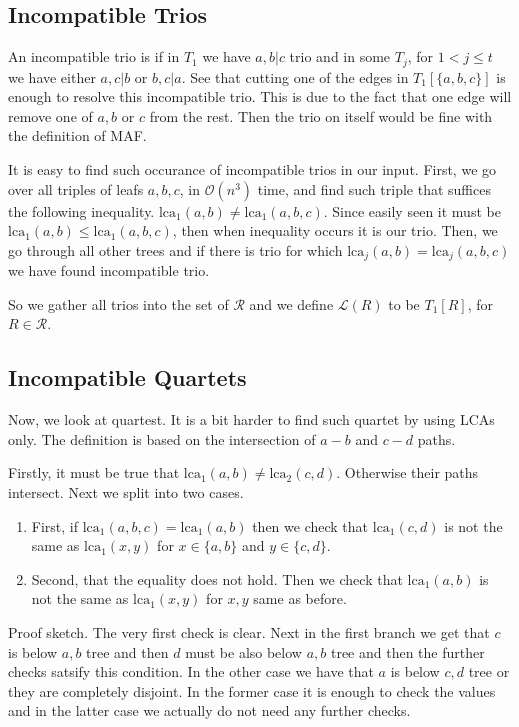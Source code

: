 \documentclass{article}
\theoremstyle{plain}
\theoremstyle{definition}
\newcommand{\lca}{\mathrm{lca}}
\newcommand{\bigO}{\mathcal{O}}
\newcommand{\trios}{\mathcal{R}}
\begin{document}
  \subsection{Incompatible Trios}

  An incompatible trio is if in $T_1$ we have $a,b|c$ trio and in some $T_j$, for $1 < j \leq t$
  we have either $a,c|b$ or $b,c|a$. See that cutting one of the edges in $T_1[\{a,b,c\}]$ is enough
  to resolve this incompatible trio. This is due to the fact that one edge will
  remove one of $a,b$ or $c$ from the rest. Then the trio on itself would be fine
  with the definition of MAF. 

  It is easy to find such occurance of incompatible trios in our input. First, we go
  over all triples of leafs $a,b,c$, in $\bigO(n^3)$ time, and find such triple that
  suffices the following inequality. $\lca_1(a,b) \neq \lca_1(a,b,c)$. Since
  easily seen it must be $\lca_1(a,b) \leq \lca_1(a,b,c)$, then when inequality
  occurs it is our trio. Then, we go through all other trees and if
  there is trio for which $\lca_j(a,b) = \lca_j(a,b,c)$ we have found incompatible
  trio.

  So we gather all trios into the set of $\trios$ and we define $\mathcal{L}(R)$
  to be $T_1[R]$, for $R \in \trios$.

  \subsection{Incompatible Quartets}

  Now, we look at quartest. It is a bit harder to find such quartet by using LCAs only. The
  definition is based on the intersection of $a-b$ and $c-d$ paths.

  Firstly, it must be true that $\lca_1(a,b) \neq \lca_2(c,d)$. Otherwise their paths intersect.
  Next we split into two cases.

  \begin{enumerate}
    \item First, if $\lca_1(a,b,c) = \lca_1(a,b)$ then we check that $\lca_1(c,d)$ is not the same
      as $\lca_1(x,y)$ for $x \in \{a,b\}$ and $y \in \{c,d\}$.
    \item Second, that the equality does not hold. Then we check that $\lca_1(a,b)$ is not the
      same as $\lca_1(x,y)$ for $x,y$ same as before.
  \end{enumerate}

  Proof sketch. The very first check is clear. Next in the first branch we get that $c$ is below $a,b$ tree
  and then $d$ must be also below $a,b$ tree and then the further checks satsify this condition. In the
  other case we have that $a$ is below $c,d$ tree or they are completely disjoint. In the former
  case it is enough to check the values and in the latter case we actually do not need any further
  checks.
\end{document}
